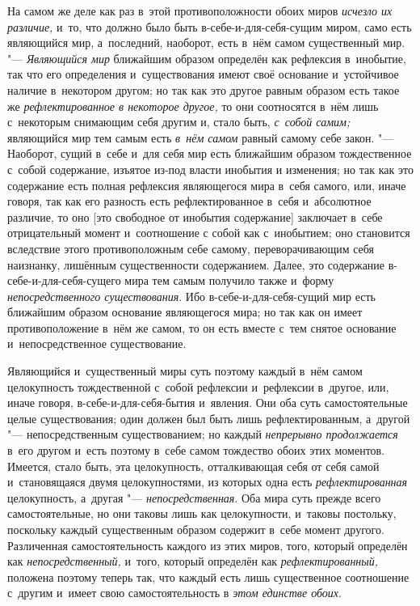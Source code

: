 На самом же деле как раз в~этой противоположности обоих миров
{\em исчезло их различие,} и~то, что должно было быть
в-себе-и-для-себя-сущим миром, само есть являющийся мир, а~последний,
наоборот, есть в~нём самом существенный мир. "---
{\em Являющийся мир} ближайшим образом определён как
рефлексия в~инобытие, так что его определения и~существования имеют своё
основание и~устойчивое наличие в~некотором другом; но так как это другое
равным образом есть такое же {\em рефлектированное в
некоторое другое,} то они соотносятся в~нём лишь с~некоторым снимающим себя
другим и, стало быть, {\em с~собой самим;} являющийся
мир тем самым есть {\em в~нём самом} равный самому себе
закон. "--- Наоборот, сущий в~себе и~для себя мир есть ближайшим образом
тождественное с~собой содержание, изъятое из-под власти инобытия и
изменения; но так как это содержание есть полная рефлексия являющегося мира
в~себя самого, или, иначе говоря, так как его разность есть
рефлектированное в~себя и~абсолютное различие, то оно [это свободное от
инобытия содержание] заключает в~себе отрицательный момент и~соотношение с
собой как с~инобытием; оно становится вследствие этого противоположным себе
самому, переворачивающим себя наизнанку, лишённым существенности
содержанием. Далее, это содержание в-себе-и-для-себя-сущего мира тем самым
получило также и~форму {\em непосредственного
существования}. Ибо в-себе-и-для-себя-сущий мир есть ближайшим образом
основание являющегося мира; но так как он имеет противоположение в~нём же
самом, то он есть вместе с~тем снятое основание и~непосредственное
существование.

Являющийся и~существенный миры суть поэтому каждый в~нём самом целокупность
тождественной с~собой рефлексии и~рефлексии в~другое, или, иначе говоря,
в-себе-и-для-себя-бытия и~явления. Они оба суть самостоятельные целые
существования; один должен был быть лишь рефлектированным, а~другой
"--- непосредственным существованием; но каждый
{\em непрерывно продолжается} в~его другом и~есть
поэтому в~себе самом тождество обоих этих моментов. Имеется, стало быть,
эта целокупность, отталкивающая себя от себя самой и~становящаяся двумя
целокупностями, из которых одна есть
{\em рефлектированная} целокупность, а~другая
"--- {\em непосредственная}. Оба мира суть прежде всего
самостоятельные, но они таковы лишь как целокупности, и~таковы постольку,
поскольку каждый существенным образом содержит в~себе момент другого.
Различенная самостоятельность каждого из этих миров, того, который
определён как {\em непосредственный,} и~того, который
определён как {\em рефлектированный,} положена поэтому
теперь так, что каждый есть лишь существенное соотношение с~другим и~имеет
свою самостоятельность в {\em этом единстве обоих}.

